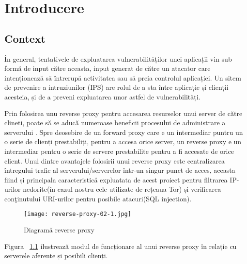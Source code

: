 
\chapter{Introducere}
\label{cap:Introducere}


\section{Context}

În general, tentativele de expluatarea vulnerabilităților unei aplicații vin sub formă de input către aceasta, input generat de către un atacator care intenționează să întrerupă activitatea sau să preia controlul aplicației. Un sitem de prevenire a intruziunilor (IPS) are rolul de a sta între aplicație și clienții acesteia, și de a preveni expluatarea unor astfel de vulnerabilități. 

Prin folosirea unu reverse proxy pentru accesarea resurselor unui server de către clineti, poate să se aducă numeroase beneficii procesului de administrare a serverului \cite{top_8}. Spre deosebire de un forward proxy care e un intermediar puntru un o serie de clienți prestabiliți, pentru a accesa orice server, un reverse proxy e un intermediar pentru o serie de servere prestabilite pentru a fi accesate de orice client. Unul dintre avantajele folosirii unui reverse proxy este centralizarea întregului trafic al serverului/serverelor într-un singur punct de acces, aceasta fiind și principala caracteristică expluatata de acest proiect pentru filtrarea IP-urilor nedorite(în cazul nostru cele utilizate de rețeaua Tor) și verificarea conţinutului URI-urilor pentru posibile atacuri(SQL injection).

\begin{figure}[h]
	\centering
	\texttt{[image: reverse-proxy-02-1.jpg]}
	\caption{ Diagramă reverse proxy }
	\label{fig:reverse-proxy}
\end{figure}

Figura ~\ref{fig:reverse-proxy}  ilustrează modul de funcționare al unui reverse proxy în relație cu serverele aferente și posibili clienți.  \\


 

